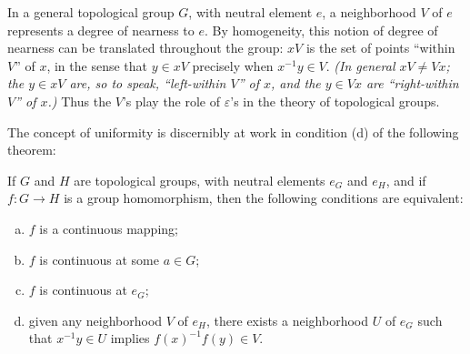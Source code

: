 In a general topological group \( G \), with neutral element \( e \), a neighborhood \( V \) of \( e \) represents a degree of nearness to \( e \). By homogeneity, this notion of degree of nearness can be translated throughout the group: \( xV \) is the set of points “within \( V \)” of \( x \), in the sense that \( y \in xV \) precisely when \( x^{-1}y \in V \).
\emph{(In general \( xV \neq Vx \); the \( y \in xV \) are, so to speak, “left-within \( V \)” of \( x \), and the \( y \in Vx \) are “right-within \( V \)” of \( x \).)} Thus the \( V \)’s play the role of \( \varepsilon \)’s in the theory of topological groups.

The concept of uniformity is discernibly at work in condition (d) of the following theorem:

\begin{theorem}
    \label{thm:continuity-homomorphisms-top-groups}

    If \( G \) and \( H \) are topological groups, with neutral elements \( e_G \) and \( e_H \), and if
    \( f : G \to H \) is a group homomorphism, then the following conditions are equivalent:
    \begin{enumerate}[(a)]
        \item \( f \) is a continuous mapping;
        \item \( f \) is continuous at some \( a \in G \);
        \item \( f \) is continuous at \( e_G \);
        \item given any neighborhood \( V \) of \( e_H \), there exists a neighborhood \( U \) of \( e_G \) such that \( x^{-1}y \in U \) implies \( f(x)^{-1}f(y) \in V \).
    \end{enumerate}
\end{theorem}

